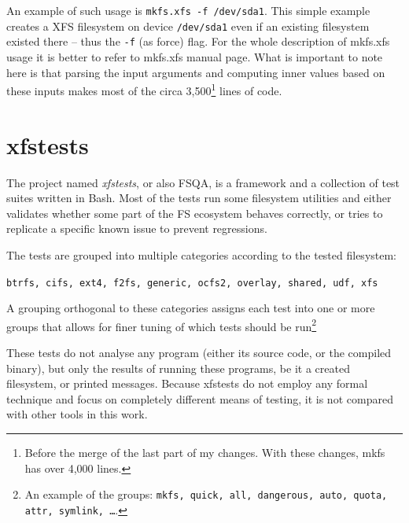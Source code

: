 An example of such usage is {\tt mkfs.xfs -f /dev/sda1}. This simple example creates a XFS filesystem on device {\tt /dev/sda1} even if an existing filesystem existed there -- thus the {\tt -f} (as force) flag. For the whole description of mkfs.xfs usage it is better to refer to mkfs.xfs manual page. What is important to note here is that parsing the input arguments and computing inner values based on these inputs makes most of the circa 3,500\footnote{Before the merge of the last part of my changes. With these changes, mkfs has over 4,000 lines.} lines of code.


\section{xfstests}\label{chap:xfs:xfstests}

The project named {\em xfstests}, or also FSQA, is a framework and a
collection of test suites written in Bash. Most of the tests run some
filesystem utilities and either validates whether some part of the FS
ecosystem behaves correctly, or tries to replicate a specific known issue
to prevent regressions.

The tests are grouped into multiple categories according to the tested filesystem:

{\tt btrfs, cifs, ext4, f2fs, generic, ocfs2, overlay, shared, udf, xfs}

A grouping orthogonal to these categories assigns each test into one or
more groups that allows for finer tuning of which tests should be
run\footnote{An example of the groups: {\tt mkfs, quick, all, dangerous,
auto, quota, attr, symlink, \ldots}.}

These tests do not analyse any program (either its source code, or the
compiled binary), but only the results of running these programs, be it a
created filesystem, or printed messages. Because xfstests do not employ any
formal technique and focus on completely different means of testing, it is
not compared with other tools in this work.
